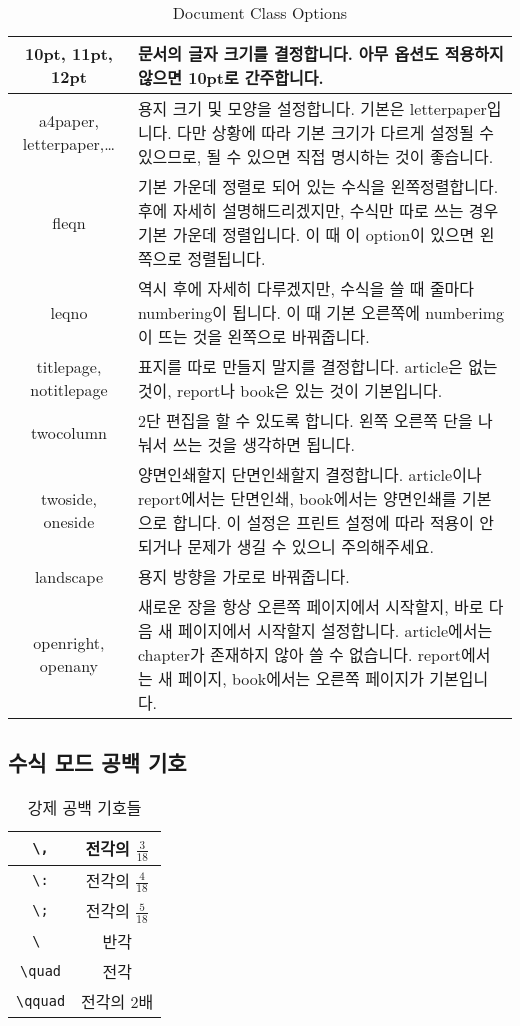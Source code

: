\begin{table}[h]
	\centering
	\begin{tabular}{|c|m{320pt}|}
		\hline
		10pt, 11pt, 12pt & 문서의 글자 크기를 결정합니다. 아무 옵션도 적용하지 않으면 10pt로 간주합니다.\\
		\hline
		a4paper, letterpaper,\dots & 용지 크기 및 모양을 설정합니다. 기본은 letterpaper입니다. 다만 상황에 따라 기본 크기가 다르게 설정될 수 있으므로, 될 수 있으면 직접 명시하는 것이 좋습니다.\\
		\hline
		fleqn & 기본 가운데 정렬로 되어 있는 수식을 왼쪽정렬합니다. 후에 자세히 설명해드리겠지만, 수식만 따로 쓰는 경우 기본 가운데 정렬입니다. 이 때 이 option이 있으면 왼쪽으로 정렬됩니다.\\
		\hline
		leqno & 역시 후에 자세히 다루겠지만, 수식을 쓸 때 줄마다 numbering이 됩니다. 이 때 기본 오른쪽에 numberimg이 뜨는 것을 왼쪽으로 바꿔줍니다.\\
		\hline
		titlepage, notitlepage & 표지를 따로 만들지 말지를 결정합니다. article은 없는 것이, report나 book은 있는 것이 기본입니다.\\
		\hline
		twocolumn & 2단 편집을 할 수 있도록 합니다. 왼쪽 오른쪽 단을 나눠서 쓰는 것을 생각하면 됩니다.\\
		\hline
		twoside, oneside & 양면인쇄할지 단면인쇄할지 결정합니다. article이나 report에서는 단면인쇄, book에서는 양면인쇄를 기본으로 합니다. 이 설정은 프린트 설정에 따라 적용이 안 되거나 문제가 생길 수 있으니 주의해주세요.\\
		\hline
		landscape & 용지 방향을 가로로 바꿔줍니다.\\
		\hline
		openright, openany & 새로운 장을 항상 오른쪽 페이지에서 시작할지, 바로 다음 새 페이지에서 시작할지 설정합니다. article에서는 chapter가 존재하지 않아 쓸 수 없습니다. report에서는 새 페이지, book에서는 오른쪽 페이지가 기본입니다.\\
		\hline
	\end{tabular}
    \caption{Document Class Options}
    \label{tab:doc cls opt}
\end{table}

\newpage
\subsection{수식 모드 공백 기호}
\begin{table}[hp]
	\centering
	\begin{tabular}{|c|c|}
		\hline
		\verb|\,| & 전각의 $\frac{3}{18}$\\
		\hline
		\verb|\:| & 전각의 $\frac{4}{18}$\\
		\hline
		\verb|\;| & 전각의 $\frac{5}{18}$\\
		\hline
		\verb|\ | & 반각\\
		\hline
		\verb|\quad| & 전각\\
		\hline
		\verb|\qquad| & 전각의 2배\\
		\hline
	\end{tabular}
	\caption{강제 공백 기호들}
	\label{tab:quad}
\end{table}

